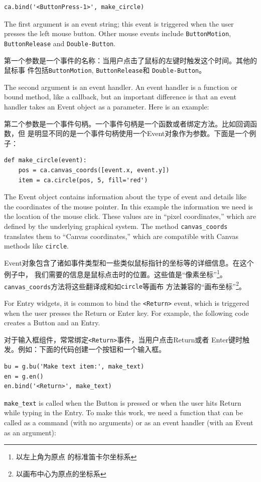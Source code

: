 \documentclass[10pt]{book}
\begin{document}
\begin{CJK}{UTF8}{gbsn}
\begin{verbatim}
ca.bind('<ButtonPress-1>', make_circle)
\end{verbatim}
%
The first argument is an event string; this event is triggered
when the user presses the left mouse button.  Other mouse
events include {\tt ButtonMotion}, {\tt ButtonRelease} and
{\tt Double-Button}.

第一个参数是一个事件的名称：当用户点击了鼠标的左键时触发这个时间。其他的鼠标事
件包括{\tt ButtonMotion}, {\tt ButtonRelease}和 {\tt Double-Button}。

The second argument is an event handler.  An event handler
is a function or bound method, like a callback, but an important
difference is that an event handler takes an Event object as a
parameter.  Here is an example:

第二个参数是一个事件句柄。一个事件句柄是一个函数或者绑定方法。比如回调函数，但
是明显不同的是一个事件句柄使用一个Event对象作为参数。下面是一个例子：

\begin{verbatim}
def make_circle(event):
    pos = ca.canvas_coords([event.x, event.y])
    item = ca.circle(pos, 5, fill='red')
\end{verbatim}
%
The Event object contains information about the type of event and
details like the coordinates of the mouse pointer.  In this example
the information we need is
the location of the mouse click.  These
values are in ``pixel coordinates,'' which are defined by the
underlying graphical system.  The method \verb"canvas_coords"
translates them to ``Canvas coordinates,'' which are compatible with
Canvas methods like {\tt circle}.

Event对象包含了诸如事件类型和一些类似鼠标指针的坐标等的详细信息。在这个例子中，
我们需要的信息是鼠标点击时的位置。这些值是``像素坐标''\footnote{以左上角为原点
的标准笛卡尔坐标系}。\verb"canvas_coords"方法将这些翻译成和如{\tt circle}等画布
方法兼容的``画布坐标''\footnote{以画布中心为原点的坐标系}。

For Entry widgets, it is common to bind the \verb"<Return>" event,
which is triggered when the user presses the {\sf Return} or
{\sf Enter} key.  For example, the following code creates a Button
and an Entry.

对于输入框组件，常常绑定\verb"<Return>"事件，当用户点击{\sf Return}或者{\sf
Enter}键时触发。例如：下面的代码创建一个按钮和一个输入框。

\begin{verbatim}
bu = g.bu('Make text item:', make_text)
en = g.en()
en.bind('<Return>', make_text)
\end{verbatim}
%
\verb"make_text" is called when the Button is pressed or when
the user hits {\sf Return} while typing in the Entry.  To make
this work, we need a function that can be called as a command
(with no arguments) or as an event handler (with an Event
as an argument):


\end{CJK}
\end{document}
